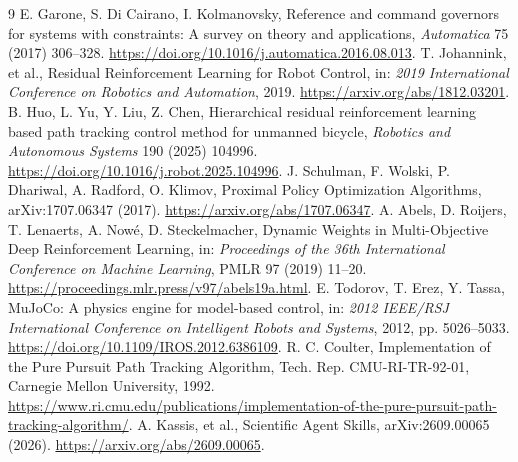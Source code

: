 \documentclass[final,5p,times,twocolumn]{elsarticle}
\begin{document}
\begingroup\footnotesize
\begin{thebibliography}{9}
 E. Garone, S. Di Cairano, I. Kolmanovsky, Reference and command governors for systems with constraints: A survey on theory and applications, \emph{Automatica} 75 (2017) 306--328. \url{https://doi.org/10.1016/j.automatica.2016.08.013}.
 T. Johannink, et al., Residual Reinforcement Learning for Robot Control, in: \emph{2019 International Conference on Robotics and Automation}, 2019. \url{https://arxiv.org/abs/1812.03201}.
 B. Huo, L. Yu, Y. Liu, Z. Chen, Hierarchical residual reinforcement learning based path tracking control method for unmanned bicycle, \emph{Robotics and Autonomous Systems} 190 (2025) 104996. \url{https://doi.org/10.1016/j.robot.2025.104996}.
 J. Schulman, F. Wolski, P. Dhariwal, A. Radford, O. Klimov, Proximal Policy Optimization Algorithms, arXiv:1707.06347 (2017). \url{https://arxiv.org/abs/1707.06347}.
 A. Abels, D. Roijers, T. Lenaerts, A. Now\'{e}, D. Steckelmacher, Dynamic Weights in Multi-Objective Deep Reinforcement Learning, in: \emph{Proceedings of the 36th International Conference on Machine Learning}, PMLR 97 (2019) 11--20. \url{https://proceedings.mlr.press/v97/abels19a.html}.
 E. Todorov, T. Erez, Y. Tassa, MuJoCo: A physics engine for model-based control, in: \emph{2012 IEEE/RSJ International Conference on Intelligent Robots and Systems}, 2012, pp. 5026--5033. \url{https://doi.org/10.1109/IROS.2012.6386109}.
 R. C. Coulter, Implementation of the Pure Pursuit Path Tracking Algorithm, Tech. Rep. CMU-RI-TR-92-01, Carnegie Mellon University, 1992. \url{https://www.ri.cmu.edu/publications/implementation-of-the-pure-pursuit-path-tracking-algorithm/}.
 A. Kassis, et al., Scientific Agent Skills, arXiv:2609.00065 (2026). \url{https://arxiv.org/abs/2609.00065}.
\end{thebibliography}
\endgroup
\end{document}
